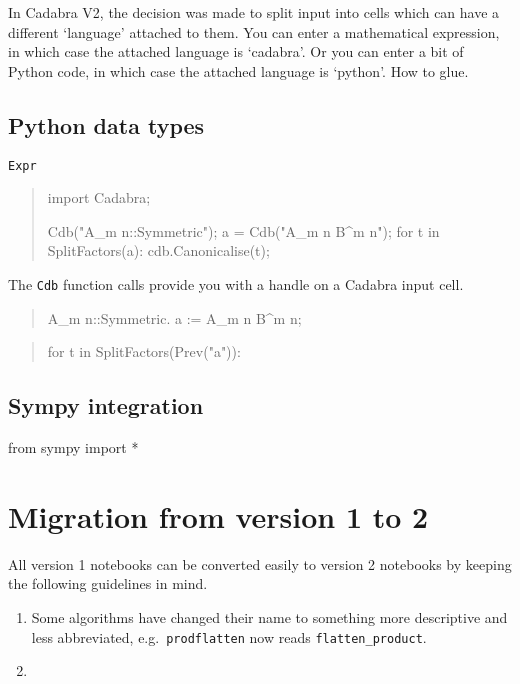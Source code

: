 \documentclass[11pt]{article}
\begin{document}
In Cadabra V2, the decision was made to split input into cells which
can have a different `language' attached to them. You can enter a
mathematical expression, in which case the attached language is
`cadabra'. Or you can enter a bit of Python code, in which case the
attached language is `python'. How to glue.

\subsection{Python data types}

\begin{description}
\item[{\tt Expr}] 
\end{description}


\begin{quote}
import Cadabra;


Cdb("A_{m n}::Symmetric");
a = Cdb("A_{m n} B^{m n}");
for t in SplitFactors(a):
    cdb.Canonicalise(t);

\end{quote}
The {\tt Cdb} function calls provide you with a handle on 
a Cadabra input cell. 

\begin{quote}
A_{m n}::Symmetric.
a := A_{m n} B^{m n};
\end{quote}
\begin{quote}
for t in SplitFactors(Prev("a")):
   
\end{quote}


\subsection{Sympy integration}

from sympy import *



\section{Migration from version 1 to 2}

All version 1 notebooks can be converted easily to version 2 notebooks by 
keeping the following guidelines in mind.
\begin{enumerate}
\item Some algorithms have changed their name to something more descriptive
and less abbreviated, e.g.~{\tt prodflatten} now reads {\tt flatten\_product}.
\item 
\end{enumerate}
\end{document}
